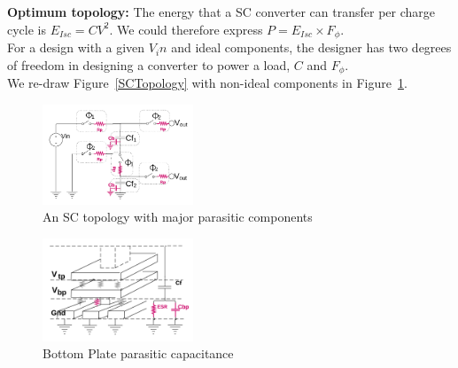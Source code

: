 \documentclass[letterpaper,twocolumn,10pt]{article}
\begin{document}
\textbf{Optimum topology: }The energy that a SC converter can transfer per charge cycle is $E_{Isc} = CV^2$. We could therefore express $P = E_{Isc}\times F_\phi$.\\
For a design with a given $V_in$ and ideal components, the designer has two degrees of freedom in designing a converter to power a load, $C$ and $F_\phi$.\\  
We re-draw Figure~\ref{SCTopology} with non-ideal components in Figure~\ref{NonIdealSCTopology}.\\
\begin{figure}[here]
\includegraphics[width=0.4\textwidth]{SCTopologyParasitics}
\caption{An SC topology with major parasitic components}
\label{NonIdealSCTopology}
\end{figure}
\begin{figure}[here]
\includegraphics[width=0.4\textwidth]{BottomPlateCap}
\caption{Bottom Plate parasitic capacitance}
\label{BottomPlatePar}
\end{figure}
\end{document}
